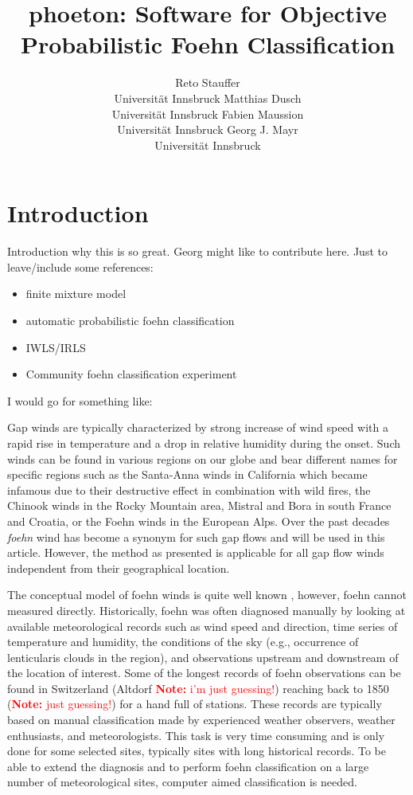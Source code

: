 \documentclass[article,nojss,shortnames]{jss}
\author{Reto Stauffer\\Universit\"at Innsbruck
\And Matthias Dusch\\Universit\"at Innsbruck
\AND Fabien Maussion\\Universit\"at Innsbruck
\And Georg J. Mayr\\Universit\"at Innsbruck}
\title{phoeton: Software for Objective Probabilistic Foehn Classification}
\newcommand{\note}[1]{\textcolor{red}{\textbf{Note:} #1}}
\begin{document}
\section{Introduction}

Introduction why this is so great. Georg might like to contribute
here. Just to leave/include some references:
\begin{itemize}
    \item finite mixture model \citep{leisch2004,gruen2008}
    \item automatic probabilistic foehn classification \cite{plavcan2014}
    \item IWLS/IRLS \citep{mccullagh1989}
    \item Community foehn classification experiment \cite{mayr2018unpublished}
\end{itemize}

I would go for something like:

Gap winds are typically characterized by strong increase of wind speed with a rapid
rise in temperature and a drop in relative humidity during the onset. Such winds can be
found in various regions on our globe and bear different names for specific
regions such as the Santa-Anna winds in California which became infamous due to
their destructive effect in combination with wild fires, the Chinook winds in
the Rocky Mountain area, Mistral and Bora in south France and Croatia, or the
Foehn winds in the European Alps.  Over the past decades \textit{foehn} wind
has become a synonym for such gap flows and will be used in this article.
However, the method as presented is applicable for all gap flow winds
independent from their geographical location.

The conceptual model of foehn winds is quite well known
\citep{armi2007,mayr2008,armi2011}, however, foehn cannot measured directly.
Historically, foehn was often diagnosed manually by looking at available
meteorological records such as wind speed and direction, time series of
temperature and humidity, the conditions of the sky (e.g., occurrence of
lenticularis clouds in the region), and observations upstream and downstream of
the location of interest.  Some of the longest records of foehn observations
can be found in Switzerland (Altdorf \note{i'm just guessing!}) reaching back
to 1850 (\note{just guessing!}) for a hand full of stations.  These records are
typically based on manual classification made by experienced weather observers,
weather enthusiasts, and meteorologists.  This task is very time consuming and
is only done for some selected sites, typically sites with long historical
records. To be able to extend the diagnosis and to perform foehn classification
on a large number of meteorological sites, computer aimed classification is
needed.
\end{document}
